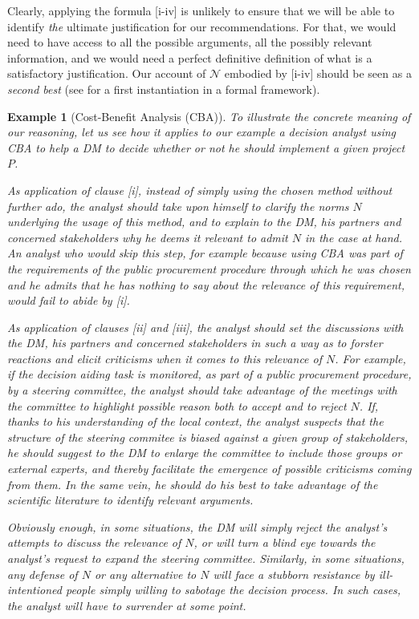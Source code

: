 \documentclass[preprint, french, english, 11pt, authoryear]{elsarticle}%
\newtheorem{example}{Example}
\newcommand{\adv}{\mathscr{N}}
\begin{document}
Clearly, applying the formula [i-iv] is unlikely to ensure that we will be able to identify \emph{the} ultimate justification for our recommendations. For that, we would need to have access to all the possible arguments, all the possibly relevant information, and we would need a perfect definitive definition of what is a satisfactory justification. Our account of $\adv$ embodied by [i-iv] should be seen as a \emph{second best} (see \cite{cailloux_formal_2018} for a first instantiation in a formal framework).

\begin{example}[Cost-Benefit Analysis (CBA)]
To illustrate the concrete meaning of our reasoning, let us see how it applies to our example a decision analyst using CBA to help a \ac{DM} to decide whether or not he should implement a given project $P$.

As application of clause [i], instead of simply using the chosen method without further ado, the analyst should take upon himself to clarify the norms $N$ underlying the usage of this method, and to explain to the \ac{DM}, his partners and concerned stakeholders why he deems it relevant to admit $N$ in the case at hand. An analyst who would skip this step, for example because using CBA was part of the requirements of the public procurement procedure through which he was chosen and he admits that he has nothing to say about the relevance of this requirement, would fail to abide by [i].

As application of clauses [ii] and [iii], the analyst should set the discussions with the \ac{DM}, his partners and concerned stakeholders in such a way as to forster reactions and elicit criticisms when it comes to this relevance of $N$. For example, if the decision aiding task is monitored, as part of a public procurement procedure, by a steering committee, the analyst should take advantage of the meetings with the committee to highlight possible reason both to accept and to reject $N$. If, thanks to his understanding of the local context, the analyst suspects that the structure of the steering commitee is biased against a given group of stakeholders, he should suggest to the \ac{DM} to enlarge the committee to include those groups or external experts, and thereby facilitate the emergence of possible criticisms coming from them. In the same vein, he should do his best to take advantage of the scientific literature to identify relevant arguments.  

Obviously enough, in some situations, the \ac{DM} will simply reject the analyst's attempts to discuss the relevance of $N$, or will turn a blind eye towards the analyst's request to expand the steering committee. Similarly, in some situations, any defense of $N$ or any alternative to $N$ will face a stubborn resistance by ill-intentioned people simply willing to sabotage the decision process. In such cases, the analyst will have to surrender at some point.


\end{example}
\end{document}
